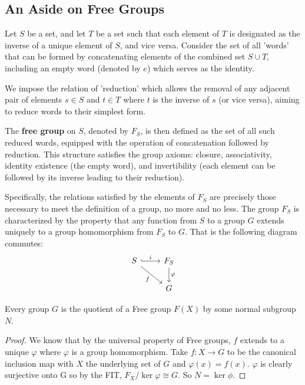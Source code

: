 \subsection{An Aside on Free Groups}

\begin{definition}
Let $S$ be a set, and let $T$ be a set such that each element of $T$ is designated as the inverse of a unique element of $S$, and vice versa. Consider the set of all 'words' that can be formed by concatenating elements of the combined set $S \cup T$, including an empty word (denoted by $e$) which serves as the identity.

We impose the relation of 'reduction' which allows the removal of any adjacent pair of elements $s \in S$ and $t \in T$ where $t$ is the inverse of $s$ (or vice versa), aiming to reduce words to their simplest form. 

The \textbf{free group} on $S$, denoted by $F_S$, is then defined as the set of all such reduced words, equipped with the operation of concatenation followed by reduction. This structure satisfies the group axioms: closure, associativity, identity existence (the empty word), and invertibility (each element can be followed by its inverse leading to their reduction).

Specifically, the relations satisfied by the elements of $F_S$ are precisely those necessary to meet the definition of a group, no more and no less. The group $F_S$ is characterized by the property that any function from $S$ to a group $G$ extends uniquely to a group homomorphism from $F_S$ to $G$. That is the following diagram commutes:
\[
\begin{tikzcd}
S \arrow[r, hook, "i"] \arrow[rd, "f"'] & F_S \arrow[d, "\varphi"] \\
 & G
\end{tikzcd}
\]
\end{definition}

\begin{theorem}
    Every group $G$ is the quotient of a Free group $F(X)$ by some normal subgroup $N$.
\end{theorem}

\begin{proof}
    We know that by the universal property of Free groups, $f$ extends to a unique $\varphi$ where $\varphi$ is a group homomorphism. Take $f: X \to G$ to be the canonical inclusion map with $X$ the underlying set of $G$ and $\varphi(x) = f(x).$ $\varphi$ is clearly surjective onto G so by the FIT, $F_X/\ker \varphi \cong G$. So $N = \ker \phi$.
\end{proof}

